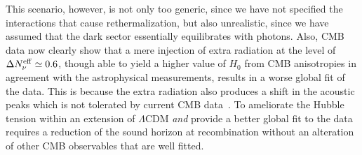 \documentclass[a4paper,11pt]{article}
\begin{document}
This scenario, however, is not only too generic, since we have not specified the interactions that cause
rethermalization, but also unrealistic, since we have assumed that the dark sector essentially equilibrates with photons.
Also, CMB data now clearly show that a mere injection of extra radiation at the level of
 $\Delta N_\nu^{\rm eff} \simeq 0.6$, though able to yield a higher value of $H_0$ from CMB anisotropies in agreement with
the astrophysical measurements, results in a worse global fit of the data. This is because the 
extra radiation also produces a shift in the acoustic peaks which is
not tolerated by current  CMB data~\cite{Knox:2019rjx}. 
To ameliorate the Hubble tension within an extension of $\Lambda$CDM {\it and} provide a better global fit to the data
requires a reduction of the sound horizon at recombination without an alteration of other CMB observables that are well fitted. 
\end{document}
